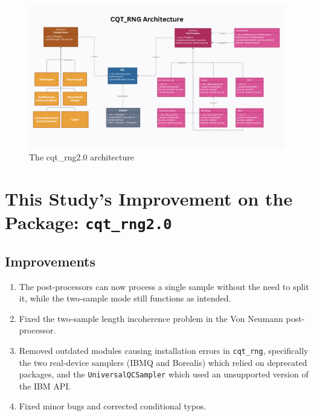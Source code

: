 \begin{landscape}
    \begin{figure}[h!]
    \centering
    \includegraphics[width = 23cm]{figures/UML.pdf}
    \caption{The cqt\_rng2.0 architecture}
    \label{fig:UML}
\end{figure}
\end{landscape}
\section{This Study's Improvement on the Package: \texttt{cqt\_rng2.0}}

\subsection{Improvements}
\begin{enumerate}
    \item The post-processors can now process a single sample without the need to split it, while the two-sample mode still functions as intended.
    \item Fixed the two-sample length incoherence problem in the Von Neumann post-processor.
    \item Removed outdated modules causing installation errors in \texttt{cqt\_rng}, specifically the two real-device samplers (IBMQ and Borealis) which relied on deprecated packages, and the \texttt{UniversalQCSampler} which used an unsupported version of the IBM API.
    \item Fixed minor bugs and corrected conditional typos.
\end{enumerate}

